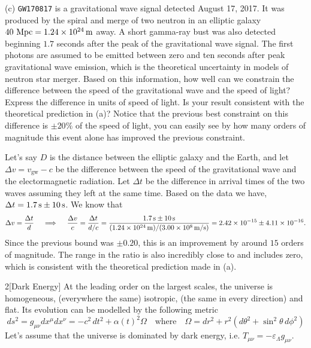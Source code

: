 \documentclass{../../templates/lkx_pset}
\begin{document}
\begin{parts}
  \begin{part}{(c)}
    \texttt{GW170817} is a gravitational wave signal detected August 17, 2017. It was produced by the spiral and merge of two neutron in an elliptic galaxy $40\textrm{ Mpc} = \msi{1.24e24}$ away. A short gamma-ray bust was also detected beginning $1.7$ seconds after the peak of the gravitational wave signal. The first photons are assumed to be emitted between zero and ten seconds after peak gravitational wave emission, which is the theoretical uncertainty in models of neutron star merger. Based on this information, how well can we constrain the difference between the speed of the gravitational wave and the speed of light? Express the difference in units of speed of light. Is your result consistent with the theoretical prediction in (a)? Notice that the previous best constraint on this difference is $\pm 20\%$ of the speed of light, you can easily see by how many orders of magnitude this event alone has improved the previous constraint.
  \end{part}

  Let's say $D$ is the distance between the elliptic galaxy and the Earth, and let $\Delta v = v_{\textrm{gw}} - c$ be the difference between the speed of the gravitational wave and the electormagnetic radiation. Let $\Delta t$ be the difference in arrival times of the two waves assuming they left at the same time. Based on the data we have, $\Delta t = \ssi{1.7}\pm \ssi{10}$. We know that
  \[
    \Delta v = \frac{\Delta t}{d} \quad\implies\quad \frac{\Delta v}{c} = \frac{\Delta t}{d/c} = 
    \frac{\ssi{1.7}\pm \ssi{10}}{(\msi{1.24e24})/(\mpssi{3.00e8})} = 2.42\times 10^{-15}\pm 4.11\times 10^{-16}.
  \]
  Since the previous bound was $\pm 0.20$, this is an improvement by around $15$ orders of magnitude. The range in the ratio is also incredibly close to and includes zero, which is consistent with the theoretical prediction made in (a).
\end{parts}

\pagebreak
\begin{problem}{2}[Dark Energy]
  At the leading order on the largest scales, the universe is homogeneous, (everywhere the same) isotropic, (the same in every direction) and flat. Its evolution can be modelled by the following metric
  \[
    ds^2 = g_{\mu\nu} dx^\mu dx^\nu = -c^2\, dt^2 + \alpha(t)^2 \Omega \quad\textrm{where}\quad \Omega = dr^2 + r^2\left(d\theta^2 + \sin^2\theta\, d\phi^2\right)
  \]
  Let's assume that the universe is dominated by dark energy, i.e. $T_{\mu\nu} = -\varepsilon_\Lambda g_{\mu\nu}$.
\end{problem}
\end{document}
